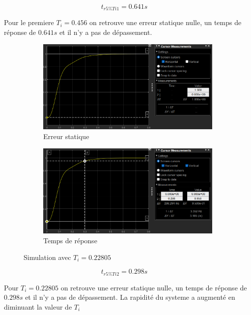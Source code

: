 \documentclass[12pt, a4paper]{report}
\begin{document}
\[
    t_{r5\%Ti1} = 0.641s \quad
\]

Pour le premiere $T_i = 0.456$ on retrouve une erreur statique nulle, un temps de réponse de $0.641s$ et il n'y a pas de dépassement.

\begin{figure}[H]
    \begin{subfigure}[h!]{0.4\linewidth}
        \includegraphics[width=\linewidth]{sim2ti2erreur.png}
        \caption{Erreur statique}
    \end{subfigure}
    \hfill    
    \begin{subfigure}[h!]{0.4\linewidth}
        \includegraphics[width=\linewidth]{sim2ti2tr.png}
        \caption{Temps de réponse}
    \end{subfigure}
    \caption{Simulation avec $T_i = 0.22805$}
    \label{fig:sim2KTi2}
\end{figure}

\[
    t_{r5\%Ti2} = 0.298s \quad
\]

Pour $T_i = 0.22805$ on retrouve une erreur statique nulle, un temps de réponse de $ 0.298s$ et il n'y a pas de dépassement.
La rapidité du systeme a augmenté en diminuant la valeur de $T_i$
\end{document}
